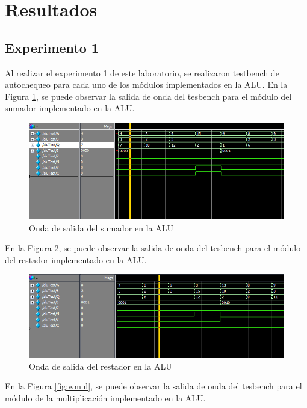 \documentclass[journal]{IEEEtran}
\begin{document}
	\section{Resultados}
	
	\subsection{Experimento 1}
	
	Al realizar el experimento 1 de este laboratorio, se realizaron testbench de autochequeo para cada uno de los módulos implementados en la ALU.
	En la Figura \ref{fig:wsum}, se puede observar la salida de onda del tesbench para el módulo del sumador implementado en la ALU.
	
	\begin{figure}[hbtp]
		\centering
		\includegraphics[scale = 0.4]{img/wsumador.png}
		\caption{Onda de salida del sumador en la ALU}
		\label{fig:wsum}
	\end{figure}
	
	En la Figura \ref{fig:wres}, se puede observar la salida de onda del tesbench para el módulo del restador implementado en la ALU.
	
	\begin{figure}[hbtp]
		\centering
		\includegraphics[scale = 0.4]{img/wrestador.png}
		\caption{Onda de salida del restador en la ALU}
		\label{fig:wres}
	\end{figure}
	
	En la Figura \ref{fig:wmul}, se puede observar la salida de onda del tesbench para el módulo de la multiplicación implementado en la ALU.
	
\end{document}
